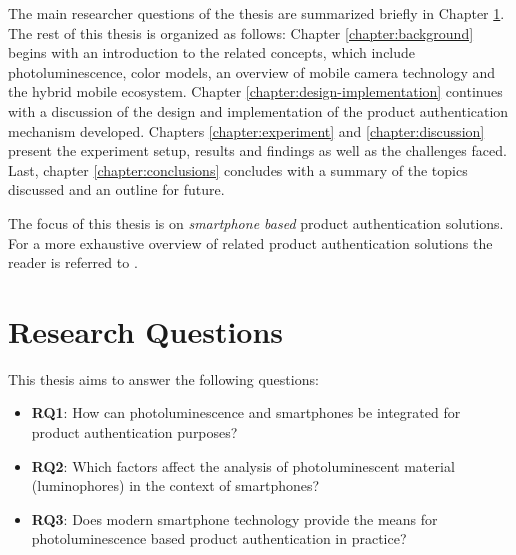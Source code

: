 \documentclass[thesis.tex]{subfiles}
\begin{document}
The main researcher questions of the thesis are summarized briefly in Chapter \ref{chapter:research-questions}. The rest of this thesis is organized as follows: Chapter \ref{chapter:background} begins with an introduction to the related concepts, which include photoluminescence, color models, an overview of mobile camera technology and the hybrid mobile ecosystem. Chapter \ref{chapter:design-implementation} continues with a discussion of the design and implementation of the product authentication mechanism developed. Chapters \ref{chapter:experiment} and \ref{chapter:discussion} present the experiment setup, results and findings as well as the challenges faced. Last, chapter \ref{chapter:conclusions} concludes with a summary of the topics discussed and an outline for future.

The focus of this thesis is on \emph{smartphone based} product authentication solutions. For a more exhaustive overview of related product authentication solutions the reader is referred to \cite{kuosmanen}.

\section{Research Questions}
\label{chapter:research-questions}

This thesis aims to answer the following questions:

\begin{itemize}
  \item \label{RQ1} \textbf{RQ1}: How can photoluminescence and smartphones be integrated for product authentication purposes?
  \item \label{RQ2} \textbf{RQ2}: Which factors affect the analysis of photoluminescent material (luminophores) in the context of smartphones?
  \item \label{RQ3} \textbf{RQ3}: Does modern smartphone technology provide the means for photoluminescence based product authentication in practice?
\end{itemize}
\end{document}
